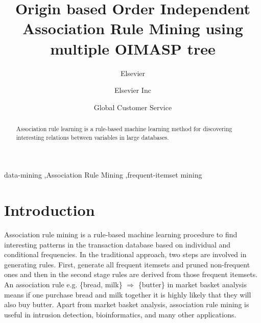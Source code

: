 \documentclass[review]{elsarticle}
\begin{document}
\begin{frontmatter}

\title{Origin based Order Independent Association Rule Mining using multiple OIMASP tree}

\author{Elsevier}
\address{Radarweg 29, Amsterdam}

\author[mymainaddress,mysecondaryaddress]{Elsevier Inc}

\author[mysecondaryaddress]{Global Customer Service}

\address[mymainaddress]{1600 John F Kennedy Boulevard, Philadelphia}
\address[mysecondaryaddress]{360 Park Avenue South, New York}

\begin{abstract}
Association rule learning is a rule-based machine learning method for discovering interesting relations between variables in large databases.
\end{abstract}

\begin{keyword}
data-mining \sep Association Rule Mining \sep frequent-itemset mining 
\end{keyword}

\end{frontmatter}

\section{Introduction}
Association rule mining is a rule-based machine learning procedure to find interesting patterns in the transaction database based on individual and conditional frequencies. In the traditional approach, two steps are involved in generating rules. First, generate all frequent itemsets and pruned non-frequent ones and then in the second stage rules are derived from those frequent itemsets. An association rule e.g. \{bread, milk\} $\Rightarrow$ \{butter\} in market basket analysis means if one purchase bread and milk together it is highly likely that they will also buy butter. Apart from market basket analysis, association rule mining is useful in intrusion detection, bioinformatics, and many other applications.
\end{document}
